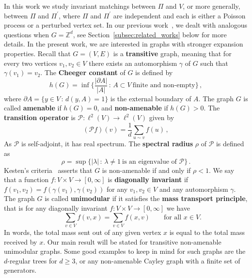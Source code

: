 \documentclass[11pt, reqno]{article}
\numberwithin{equation}{section}
\theoremstyle{definition}
\def\Z{\mathbb{Z}}
\newcommand{\1}{\mathds{1}}
\begin{document}
In this work we study invariant matchings between $\Pi$ and $V$, or more generally, between $\Pi$ and $\Pi^\prime$, where $\Pi$ and $\Pi^\prime$ are independent and each is either a Poisson process or a perturbed vertex set. In our previous work~\cite{Elboim-Spinka-Yakir}, we dealt with analogous questions when $G= \Z^d$, see Section~\ref{subsec:related_works} below for more details. In the present work, we are interested in graphs with stronger expansion properties. Recall that $G=(V,E)$ is a \textbf{transitive} graph, meaning that for every two vertices $v_1,v_2\in V$ there exists an automorphism $\gamma$ of $G$ such that $\gamma(v_1) = v_2$. 
The \textbf{Cheeger constant} of $G$ is defined by
\begin{equation}
    \label{eq:cheeger_constant}
    h(G) = \inf\Big\{ \frac{|\partial A|}{|A|} \, : \, A\subset V \ \text{finite and non-empty} \Big\} \,  , 
\end{equation}
where $\partial A = \{ y\in V \, : \, d(y,A) = 1 \}$ is the external boundary of $A$.
The graph $G$ is called \textbf{amenable} if $h(G)=0$, and \textbf{non-amenable} if $h(G)>0$.
The \textbf{transition operator} is $\mathcal{P}:\ell^2(V) \to \ell^2(V)$ given by
\begin{equation*}
    (\mathcal{P}f)(v) = \frac{1}{d} \sum_{u\sim v} f(u) \, , 
\end{equation*}
As $\mathcal{P}$ is self-adjoint, it has real spectrum. The \textbf{spectral radius} $\rho$ of $\mathcal{P}$ is defined as
\[ \rho = \sup\{ |\lambda | \, : \, \lambda\not=1 \ \text{is an eigenvalue of } \mathcal{P} \} \, .\]
Kesten's criteria~\cite{Kesten} asserts that $G$ is non-amenable if and only if $\rho<1$. We say that a function $f:V\times V\to [0,\infty]$ is \textbf{diagonally invariant} if $f(v_1,v_2) = f(\gamma(v_1),\gamma(v_2))$ for any $v_1,v_2\in V$ and any automorphism $\gamma$. The graph $G$ is called \textbf{unimodular} if it satisfies the \textbf{mass transport principle}, that is for any diagonally invariant $f:V\times V\to [0,\infty]$ we have
\begin{equation}\label{eq:mass_transport_principle}\tag{MTP}
    \qquad \sum_{v\in V} f(v,x) = \sum_{v\in V} f(x,v) \qquad \text{for all } x\in V .
\end{equation}
In words, the total mass sent out of any given vertex $x$ is equal to the total mass received by $x$. Our main result will be stated for transitive non-amenable unimodular graphs. Some good examples to keep in mind for such graphs are the $d$-regular trees for $d\ge 3$, or any non-amenable Cayley graph with a finite set of generators. 
\end{document}
